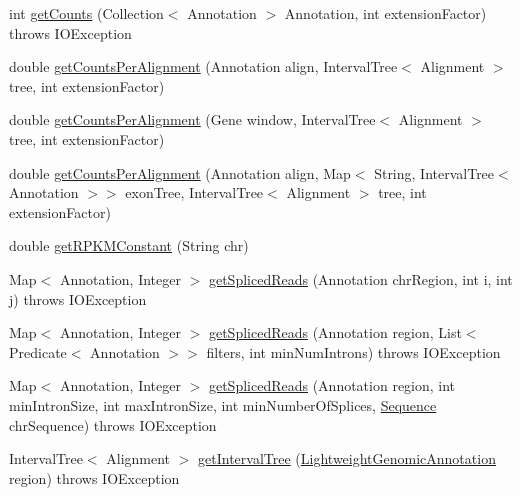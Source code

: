 \begin{DoxyCompactItemize}
\item 
int \hyperlink{classbroad_1_1pda_1_1seq_1_1segmentation_1_1_alignment_data_model_stats_a6df3c21f752e4ac12630862b07c48ba3}{get\+Counts} (Collection$<$ Annotation $>$ Annotation, int extension\+Factor)  throws I\+O\+Exception 
\item 
double \hyperlink{classbroad_1_1pda_1_1seq_1_1segmentation_1_1_alignment_data_model_stats_aa05959f24b019c2b1b124f6d9d7ca3cc}{get\+Counts\+Per\+Alignment} (Annotation align, Interval\+Tree$<$ Alignment $>$ tree, int extension\+Factor)
\item 
double \hyperlink{classbroad_1_1pda_1_1seq_1_1segmentation_1_1_alignment_data_model_stats_a92d7d2735d1e4a375f300cfe4e45cf83}{get\+Counts\+Per\+Alignment} (Gene window, Interval\+Tree$<$ Alignment $>$ tree, int extension\+Factor)
\item 
double \hyperlink{classbroad_1_1pda_1_1seq_1_1segmentation_1_1_alignment_data_model_stats_a653cb26f76dc9d095541c000262863fe}{get\+Counts\+Per\+Alignment} (Annotation align, Map$<$ String, Interval\+Tree$<$ Annotation $>$$>$ exon\+Tree, Interval\+Tree$<$ Alignment $>$ tree, int extension\+Factor)
\item 
double \hyperlink{classbroad_1_1pda_1_1seq_1_1segmentation_1_1_alignment_data_model_stats_a943dc7415136c3885385896e7173c5b9}{get\+R\+P\+K\+M\+Constant} (String chr)
\item 
Map$<$ Annotation, Integer $>$ \hyperlink{classbroad_1_1pda_1_1seq_1_1segmentation_1_1_alignment_data_model_stats_a15b1d3b05b1003be0295c3245a4e131b}{get\+Spliced\+Reads} (Annotation chr\+Region, int i, int j)  throws I\+O\+Exception 
\item 
Map$<$ Annotation, Integer $>$ \hyperlink{classbroad_1_1pda_1_1seq_1_1segmentation_1_1_alignment_data_model_stats_af0d946fdaca6e1193861f7ede06db311}{get\+Spliced\+Reads} (Annotation region, List$<$ Predicate$<$ Annotation $>$$>$ filters, int min\+Num\+Introns)  throws I\+O\+Exception 
\item 
Map$<$ Annotation, Integer $>$ \hyperlink{classbroad_1_1pda_1_1seq_1_1segmentation_1_1_alignment_data_model_stats_a2f993767ae4cfc294711cccf0161c483}{get\+Spliced\+Reads} (Annotation region, int min\+Intron\+Size, int max\+Intron\+Size, int min\+Number\+Of\+Splices, \hyperlink{classbroad_1_1core_1_1sequence_1_1_sequence}{Sequence} chr\+Sequence)  throws I\+O\+Exception 
\item 
Interval\+Tree$<$ Alignment $>$ \hyperlink{classbroad_1_1pda_1_1seq_1_1segmentation_1_1_alignment_data_model_stats_af39e2cbab15523f4ce749edfaef1a157}{get\+Interval\+Tree} (\hyperlink{interfacebroad_1_1core_1_1annotation_1_1_lightweight_genomic_annotation}{Lightweight\+Genomic\+Annotation} region)  throws I\+O\+Exception 

\end{DoxyCompactItemize}
